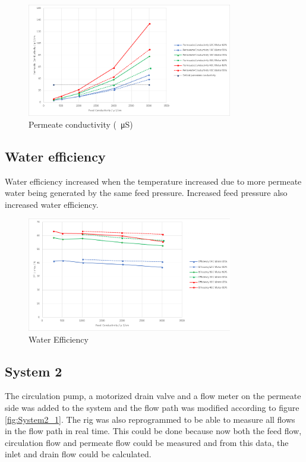 \begin{figure}[H]
    \centering
    \includegraphics[width=0.8\textwidth]{PermCond}
    \caption{Permeate conductivity (\SI{}{\micro\siemens})}
    \label{fig:Permeatecond}
\end{figure}


\subsection{Water efficiency}

Water efficiency increased when the temperature increased due to more permeate water being generated by the same feed pressure. Increased feed pressure also increased water efficiency. 

\begin{figure}[H]
    \centering
    \includegraphics[width=0.8\textwidth]{Efficiency}
    \caption{Water Efficiency}
    \label{fig:Weff}
\end{figure}

\newpage

\subsection{System 2}

The circulation pump, a motorized drain valve and a flow meter on the permeate side was added to the system and the flow path was modified according to figure \ref{fig:System2_1}. The rig was also reprogrammed to be able to measure all flows in the flow path in real time. This could be done because now both the feed flow, circulation flow and permeate flow could be measured and from this data, the inlet and drain flow could be calculated.  

